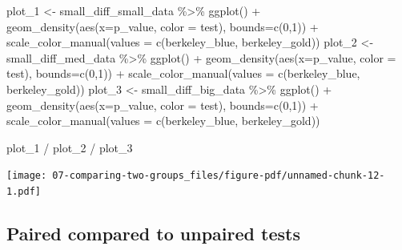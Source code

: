 \documentclass[
  letterpaper,
  DIV=11,
  numbers=noendperiod]{scrreprt}
\newenvironment{Shaded}{\begin{snugshade}}{\end{snugshade}}
\newcommand{\AttributeTok}[1]{\textcolor[rgb]{0.40,0.45,0.13}{#1}}
\newcommand{\DecValTok}[1]{\textcolor[rgb]{0.68,0.00,0.00}{#1}}
\newcommand{\FunctionTok}[1]{\textcolor[rgb]{0.28,0.35,0.67}{#1}}
\newcommand{\NormalTok}[1]{\textcolor[rgb]{0.00,0.23,0.31}{#1}}
\newcommand{\OtherTok}[1]{\textcolor[rgb]{0.00,0.23,0.31}{#1}}
\newcommand{\SpecialCharTok}[1]{\textcolor[rgb]{0.37,0.37,0.37}{#1}}
\begin{document}
\begin{Shaded}
\begin{Highlighting}[]
\NormalTok{plot\_1 }\OtherTok{\textless{}{-}}\NormalTok{ small\_diff\_small\_data }\SpecialCharTok{\%\textgreater{}\%}
  \FunctionTok{ggplot}\NormalTok{() }\SpecialCharTok{+}
  \FunctionTok{geom\_density}\NormalTok{(}\FunctionTok{aes}\NormalTok{(}\AttributeTok{x=}\NormalTok{p\_value, }\AttributeTok{color =}\NormalTok{ test), }\AttributeTok{bounds=}\FunctionTok{c}\NormalTok{(}\DecValTok{0}\NormalTok{,}\DecValTok{1}\NormalTok{)) }\SpecialCharTok{+}
  \FunctionTok{scale\_color\_manual}\NormalTok{(}\AttributeTok{values =} \FunctionTok{c}\NormalTok{(berkeley\_blue, berkeley\_gold))}
\NormalTok{plot\_2 }\OtherTok{\textless{}{-}}\NormalTok{ small\_diff\_med\_data }\SpecialCharTok{\%\textgreater{}\%}
  \FunctionTok{ggplot}\NormalTok{() }\SpecialCharTok{+}
  \FunctionTok{geom\_density}\NormalTok{(}\FunctionTok{aes}\NormalTok{(}\AttributeTok{x=}\NormalTok{p\_value, }\AttributeTok{color =}\NormalTok{ test), }\AttributeTok{bounds=}\FunctionTok{c}\NormalTok{(}\DecValTok{0}\NormalTok{,}\DecValTok{1}\NormalTok{)) }\SpecialCharTok{+}
  \FunctionTok{scale\_color\_manual}\NormalTok{(}\AttributeTok{values =} \FunctionTok{c}\NormalTok{(berkeley\_blue, berkeley\_gold))}
\NormalTok{plot\_3 }\OtherTok{\textless{}{-}}\NormalTok{ small\_diff\_big\_data }\SpecialCharTok{\%\textgreater{}\%}
  \FunctionTok{ggplot}\NormalTok{() }\SpecialCharTok{+}
  \FunctionTok{geom\_density}\NormalTok{(}\FunctionTok{aes}\NormalTok{(}\AttributeTok{x=}\NormalTok{p\_value, }\AttributeTok{color =}\NormalTok{ test), }\AttributeTok{bounds=}\FunctionTok{c}\NormalTok{(}\DecValTok{0}\NormalTok{,}\DecValTok{1}\NormalTok{)) }\SpecialCharTok{+}
  \FunctionTok{scale\_color\_manual}\NormalTok{(}\AttributeTok{values =} \FunctionTok{c}\NormalTok{(berkeley\_blue, berkeley\_gold))}

\NormalTok{plot\_1 }\SpecialCharTok{/}\NormalTok{ plot\_2 }\SpecialCharTok{/}\NormalTok{ plot\_3}
\end{Highlighting}
\end{Shaded}

\texttt{[image: 07-comparing-two-groups\_files/figure-pdf/unnamed-chunk-12-1.pdf]}

\subsection{Paired compared to unpaired
tests}\label{paired-compared-to-unpaired-tests}
\end{document}
